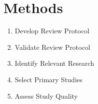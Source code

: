 \chapter{Methods\label{methods}}

\begin{enumerate}


	\item{Develop Review Protocol}

	\item{Validate Review Protocol}

	\item{Identify Relevant Research}

	\item{Select Primary Studies}

	\item{Assess Study Quality}

\end{enumerate}
